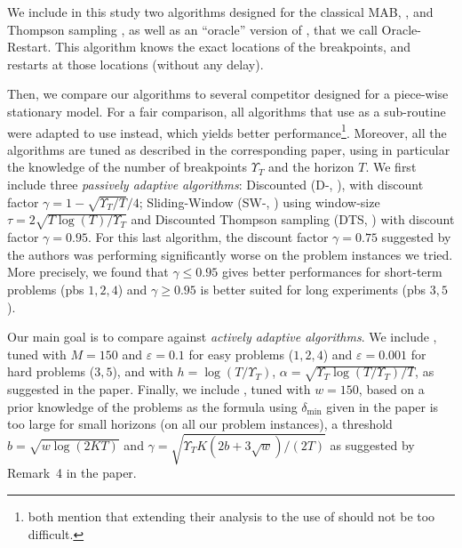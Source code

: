 We include in this study two algorithms designed for the classical MAB, \klUCB{} \cite{Garivier11KL}, and Thompson sampling \cite{AgrawalGoyal11,Kaufmann12Thompson},
as well as an ``oracle'' version of \klUCB, that we call Oracle-Restart. This algorithm knows the exact locations of the breakpoints, and restarts \klUCB{} at those locations (without any delay).

Then, we compare our algorithms to several competitor designed for a piece-wise stationary model. For a fair comparison, all algorithms that use  \UCB{} as a sub-routine were adapted to use \klUCB{} instead, which yields better performance\footnote{\cite{LiuLeeShroff17,CaoZhenKvetonXie18} both mention that extending their analysis to the use of \klUCB{} should not be too difficult.}. Moreover, all the algorithms are tuned as described in the corresponding paper, using in particular the knowledge of the number of breakpoints $\Upsilon_T$ and the horizon $T$. We first include three \emph{passively adaptive algorithms}:
Discounted \klUCB{} (D-\klUCB, \cite{Kocsis06}), with discount factor $\gamma = 1 - \sqrt{\Upsilon_T/T}/4$; Sliding-Window \klUCB{} (SW-\klUCB,  \cite{Garivier11UCBDiscount}) using window-size $\tau = 2 \sqrt{T\log(T)/\Upsilon_T}$ and Discounted Thompson sampling (DTS, \cite{RajKalyani17}) with discount factor $\gamma = 0.95$. For this last algorithm, the discount factor $\gamma=0.75$ suggested by the authors was performing significantly worse on the problem instances we tried.
More precisely, we found that $\gamma\leq0.95$ gives better performances for short-term problems (pbs $1,2,4$) and $\gamma\geq0.95$ is better suited for long experiments (pbs $3,5$).



Our main goal is to compare against \emph{actively adaptive algorithms}. We include \CUSUMklUCB{} \cite{LiuLeeShroff17}, tuned with $M=150$ and $\varepsilon=0.1$ for easy problems ($1,2,4$) and $\varepsilon=0.001$ for hard problems ($3,5$),
and with $h = \log(T/\Upsilon_T)$, $\alpha = \sqrt{\Upsilon_T \log(T/\Upsilon_T) / T}$, as suggested in the paper.
%
Finally, we include \MklUCB{} \cite{CaoZhenKvetonXie18},
tuned with $w=150$, based on a prior knowledge of the problems as the formula using $\delta_{\min}$ given in the paper is too large for small horizons (on all our problem instances), a threshold $b=\sqrt{w \log(2 K T)}$ and $\gamma=\sqrt{\Upsilon_T K (2 b + 3 \sqrt{w}) / (2 T)}$ as suggested by Remark~4 in the paper.

